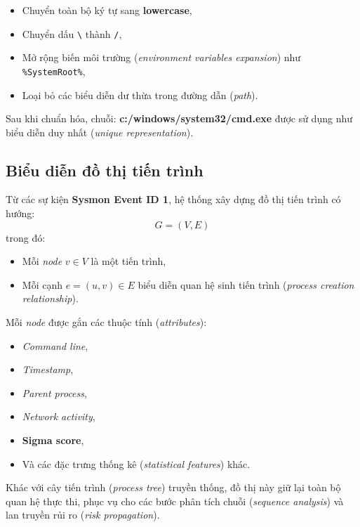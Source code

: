 \documentclass[../main.tex]{subfiles}
\begin{document}
\begin{itemize}
    \item Chuyển toàn bộ ký tự sang \textbf{lowercase},
    \item Chuyển dấu \texttt{\textbackslash} thành \texttt{/},
    \item Mở rộng biến môi trường (\textit{environment variables expansion}) như \texttt{\%SystemRoot\%},
    \item Loại bỏ các biểu diễn dư thừa trong đường dẫn (\textit{path}).
\end{itemize}

Sau khi chuẩn hóa, chuỗi: \textbf{c:/windows/system32/cmd.exe} được sử dụng như biểu diễn duy nhất (\textit{unique representation}).

\subsection{Biểu diễn đồ thị tiến trình}
\label{subsection:2.2.2}
Từ các sự kiện \textbf{Sysmon Event ID 1}, hệ thống xây dựng đồ thị tiến trình có hướng:
\begin{equation}
    G = (V, E) \tag{1.1}
\end{equation}
trong đó:
\begin{itemize}
    \item Mỗi \textit{node} $v \in V$ là một tiến trình,
    \item Mỗi cạnh $e = (u, v) \in E$ biểu diễn quan hệ sinh tiến trình (\textit{process creation relationship}).
\end{itemize}

Mỗi \textit{node} được gắn các thuộc tính (\textit{attributes}):
\begin{itemize}
    \item \textit{Command line},
    \item \textit{Timestamp},
    \item \textit{Parent process},
    \item \textit{Network activity},
    \item \textbf{Sigma score},
    \item Và các đặc trưng thống kê (\textit{statistical features}) khác.
\end{itemize}

Khác với cây tiến trình (\textit{process tree}) truyền thống, đồ thị này giữ lại toàn bộ quan hệ thực thi, phục vụ cho các bước phân tích chuỗi (\textit{sequence analysis}) và lan truyền rủi ro (\textit{risk propagation}).
\end{document}
